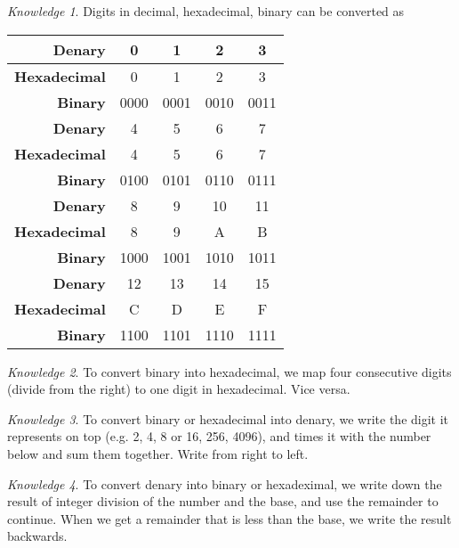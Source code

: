 \documentclass[8pt]{article}
\theoremstyle{remark}
\newtheorem{knowledge}{Knowledge}[subsection]
\begin{document}
        \begin{knowledge}
            Digits in decimal, hexadecimal, binary can be converted as
            \begin{center}
                \begin{tabular}{r|c|c|c|c}
                    \textbf{Denary} & 0 & 1 & 2 & 3\\\hline
                    \textbf{Hexadecimal} & 0 & 1 & 2 & 3\\\hline
                    \textbf{Binary} & 0000 & 0001 & 0010 & 0011\\\hline\hline
                    \textbf{Denary} & 4 & 5 & 6 & 7\\\hline
                    \textbf{Hexadecimal} & 4 & 5 & 6 & 7\\\hline
                    \textbf{Binary} & 0100 & 0101 & 0110 & 0111\\\hline\hline
                    \textbf{Denary} & 8 & 9 & 10 & 11\\\hline
                    \textbf{Hexadecimal} & 8 & 9 & A & B\\\hline
                    \textbf{Binary} & 1000 & 1001 & 1010 & 1011\\\hline\hline
                    \textbf{Denary} & 12 & 13 & 14 & 15\\\hline
                    \textbf{Hexadecimal} & C & D & E & F\\\hline
                    \textbf{Binary} & 1100 & 1101 & 1110 & 1111\\
                \end{tabular}
            \end{center}
        \end{knowledge}
        
        \begin{knowledge}
            To convert binary into hexadecimal, we map four consecutive digits (divide from the right) to one digit in hexadecimal. Vice versa.
        \end{knowledge}

        \begin{knowledge}
            To convert binary or hexadecimal into denary, we write the digit it represents on top (e.g. 2, 4, 8 or 16, 256, 4096), and times it with the number below and sum them together. Write from right to left.
        \end{knowledge}

        \begin{knowledge}
            To convert denary into binary or hexadeximal, we write down the result of integer division of the number and the base, and use the remainder to continue. When we get a remainder that is less than the base, we write the result backwards.
        \end{knowledge}
\end{document}
